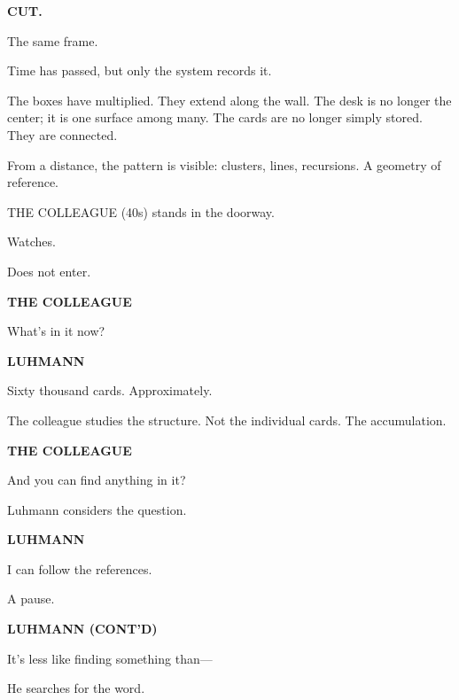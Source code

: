 \documentclass[12pt]{article}
\newcommand{\character}[1]{%
  \vspace{8pt}%
  \begin{center}\textbf{#1}\end{center}%
  \vspace{-4pt}%
}
\newenvironment{dialogue}{%
  \begin{center}%
  \begin{minipage}{0.62\textwidth}%
}{%
  \end{minipage}%
  \end{center}%
  \vspace{4pt}%
}
\newenvironment{action}{%
  \vspace{4pt}%
  \noindent\ignorespaces%
}{%
  \vspace{6pt}%
}
\begin{document}
\textbf{CUT.}

\begin{action}
The same frame.

Time has passed, but only the system records it.

The boxes have multiplied. They extend along the wall. The desk is no longer the center; it is one surface among many. The cards are no longer simply stored. They are connected.

From a distance, the pattern is visible: clusters, lines, recursions. A geometry of reference.

\medskip

THE COLLEAGUE (40s) stands in the doorway.

Watches.

Does not enter.
\end{action}

\character{THE COLLEAGUE}
\begin{dialogue}
What's in it now?
\end{dialogue}

\character{LUHMANN}
\begin{dialogue}
Sixty thousand cards. Approximately.
\end{dialogue}

\begin{action}
The colleague studies the structure. Not the individual cards. The accumulation.
\end{action}

\character{THE COLLEAGUE}
\begin{dialogue}
And you can find anything in it?
\end{dialogue}

\begin{action}
Luhmann considers the question.
\end{action}

\character{LUHMANN}
\begin{dialogue}
I can follow the references.
\end{dialogue}

\begin{action}
A pause.
\end{action}

\character{LUHMANN (CONT'D)}
\begin{dialogue}
It's less like finding something than—
\end{dialogue}

\begin{action}
He searches for the word.
\end{action}
\end{document}
